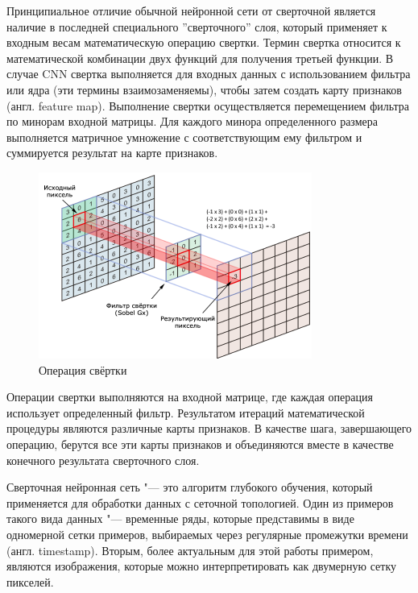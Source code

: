 \documentclass[bachelor, och, coursework]{SCWorks}
\begin{document}
        Принципиальное отличие обычной нейронной сети от сверточной является наличие в последней специального
        ''сверточного'' слоя, который применяет к входным весам математическую операцию свертки. Термин свертка
        относится к математической комбинации двух функций для получения третьей функции. В случае CNN свертка
        выполняется для входных данных с использованием фильтра или ядра (эти термины взаимозаменяемы), чтобы затем
        создать карту признаков (англ. feature map). Выполнение свертки осуществляется перемещением фильтра по минорам
        входной матрицы. Для каждого минора определенного размера выполняется матричное умножение с соответствующим ему
        фильтром и суммируется результат на карте признаков. 

        \begin{figure}[H]
            \centering
            \includegraphics[width=0.8\textwidth]{pics/convolute.png}
            \caption{Операция свёртки}
        \end{figure}

        Операции свертки выполняются на входной матрице, где каждая операция использует определенный фильтр. Результатом
        итераций математической процедуры являются различные карты признаков. В качестве шага, завершающего операцию,
        берутся все эти карты признаков и объединяются вместе в качестве конечного результата сверточного слоя.

        Сверточная нейронная сеть "--- это алгоритм глубокого обучения, который применяется для обработки данных с
        сеточной топологией. Один из примеров такого вида данных "--- временные ряды, которые представимы в виде
        одномерной сетки примеров, выбираемых через регулярные промежутки времени (англ. timestamp). Вторым, более
        актуальным для этой работы примером, являются изображения, которые можно интерпретировать как двумерную сетку
        пикселей.
\end{document}
